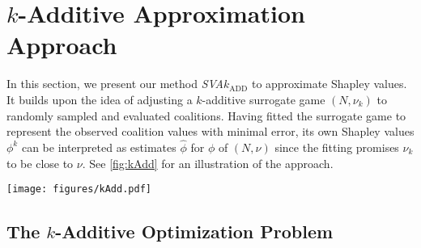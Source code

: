 \section{$k$-Additive Approximation Approach}
\label{sec:proposal}

In this section, we present our method \emph{SVA}$k_{\text{ADD}}$ to approximate Shapley values.
It builds upon the idea of adjusting a $k$-additive surrogate game $(N,\nu_k)$ to randomly sampled and evaluated coalitions.
Having fitted the surrogate game to represent the observed coalition values with minimal error, its own Shapley values $\phi^k$ can be interpreted as estimates $\hat\phi$ for %
$\phi$ of $(N,\nu)$ since the fitting promises $\nu_k$ to be close to $\nu$.
See \cref{fig:kAdd} for an illustration of the approach.

\begin{figure*}[ht]
\vskip 0.2in
\begin{center}
\texttt{[image: figures/kAdd.pdf]}
\caption{
The sampled coalition values $\nu(A_1),\ldots,\nu(A_T)$ from the given game $(N,\nu)$ are used to fit a $k$-additive surrogate game $(N,\nu_k)$ in polynomial time.
The Shapley values $\phi_1^k,\ldots,\phi_n^k$ of $(N,\nu_k)$ are obtained immediately from its $k$-additive representation.
Since $\nu_k$ approximates $\nu$, these serve as estimates of the true Shapley values $\phi_1,\ldots,\phi_n$ of $(N,\nu)$.
}
\label{fig:kAdd}
\end{center}
\vskip -0.2in
\end{figure*}

\subsection{The $k$-Additive Optimization Problem}
\label{subsec:optimization}

